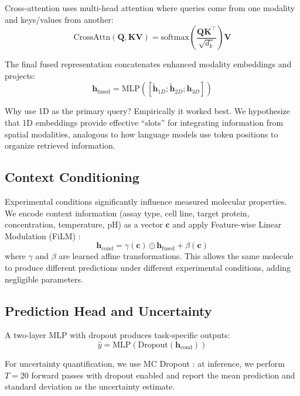 \documentclass[11pt]{article}
\begin{document}
Cross-attention uses multi-head attention where queries come from one modality and keys/values from another:
\begin{equation}
    \text{CrossAttn}(\mathbf{Q}, \mathbf{KV}) = \text{softmax}\left(\frac{\mathbf{Q}\mathbf{K}^\top}{\sqrt{d_k}}\right)\mathbf{V}
\end{equation}

The final fused representation concatenates enhanced modality embeddings and projects:
\begin{equation}
    \mathbf{h}_{\text{fused}} = \text{MLP}([\tilde{\mathbf{h}}_{1D}; \tilde{\mathbf{h}}_{2D}; \mathbf{h}_{3D}])
\end{equation}

Why use 1D as the primary query? Empirically it worked best. We hypothesize that 1D embeddings provide effective ``slots'' for integrating information from spatial modalities, analogous to how language models use token positions to organize retrieved information.

\subsection{Context Conditioning}

Experimental conditions significantly influence measured molecular properties. We encode context information (assay type, cell line, target protein, concentration, temperature, pH) as a vector $\mathbf{c}$ and apply Feature-wise Linear Modulation (FiLM) \citep{perez2018film}:
\begin{equation}
    \mathbf{h}_{\text{cond}} = \gamma(\mathbf{c}) \odot \mathbf{h}_{\text{fused}} + \beta(\mathbf{c})
\end{equation}
where $\gamma$ and $\beta$ are learned affine transformations. This allows the same molecule to produce different predictions under different experimental conditions, adding negligible parameters.

\subsection{Prediction Head and Uncertainty}

A two-layer MLP with dropout produces task-specific outputs:
\begin{equation}
    \hat{y} = \text{MLP}(\text{Dropout}(\mathbf{h}_{\text{cond}}))
\end{equation}

For uncertainty quantification, we use MC Dropout \citep{gal2016dropout}: at inference, we perform $T=20$ forward passes with dropout enabled and report the mean prediction and standard deviation as the uncertainty estimate.
\end{document}
